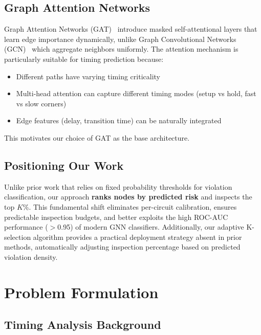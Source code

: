 \documentclass[10pt,twocolumn,journal]{IEEEtran}
\begin{document}
\subsection{Graph Attention Networks}

Graph Attention Networks (GAT)~\cite{velickovic2018gat} introduce masked self-attentional layers that learn edge importance dynamically, unlike Graph Convolutional Networks (GCN)~\cite{kipf2017gcn} which aggregate neighbors uniformly. The attention mechanism is particularly suitable for timing prediction because:
\begin{itemize}
    \item Different paths have varying timing criticality
    \item Multi-head attention can capture different timing modes (setup vs hold, fast vs slow corners)
    \item Edge features (delay, transition time) can be naturally integrated
\end{itemize}

This motivates our choice of GAT as the base architecture.

\subsection{Positioning Our Work}

Unlike prior work that relies on fixed probability thresholds for violation classification, our approach \textbf{ranks nodes by predicted risk} and inspects the top $K$\%. This fundamental shift eliminates per-circuit calibration, ensures predictable inspection budgets, and better exploits the high ROC-AUC performance ($>$0.95) of modern GNN classifiers. Additionally, our adaptive K-selection algorithm provides a practical deployment strategy absent in prior methods, automatically adjusting inspection percentage based on predicted violation density.

\section{Problem Formulation}
\label{sec:problem}

\subsection{Timing Analysis Background}
\end{document}
